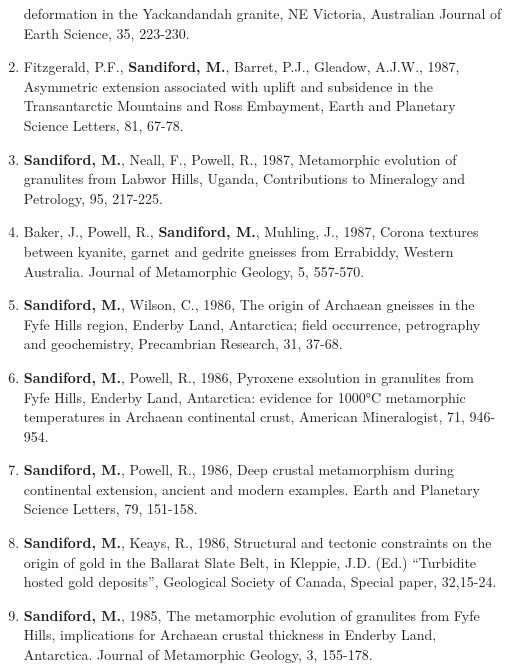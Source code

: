 \documentclass[
]{article}
\begin{document}
\begin{enumerate}
  deformation in the Yackandandah granite, NE Victoria, Australian
  Journal of Earth Science, 35, 223-230. 
\item
  Fitzgerald, P.F., \textbf{Sandiford, M.}, Barret, P.J., Gleadow,
  A.J.W., 1987, Asymmetric extension associated with uplift and
  subsidence in the Transantarctic Mountains and Ross Embayment, Earth
  and Planetary Science Letters, 81, 67-78. 
\item
  \textbf{Sandiford, M.}, Neall, F., Powell, R., 1987, Metamorphic
  evolution of granulites from Labwor Hills, Uganda, Contributions to
  Mineralogy and Petrology, 95, 217-225. 
\item
  Baker, J., Powell, R., \textbf{Sandiford, M.}, Muhling, J., 1987,
  Corona textures between kyanite, garnet and gedrite gneisses from
  Errabiddy, Western Australia. Journal of Metamorphic Geology, 5,
  557-570. 
\item
  \textbf{Sandiford, M.}, Wilson, C., 1986, The origin of Archaean
  gneisses in the Fyfe Hills region, Enderby Land, Antarctica; field
  occurrence, petrography and geochemistry, Precambrian Research, 31,
  37-68. \\
\item
  \textbf{Sandiford, M.}, Powell, R., 1986, Pyroxene exsolution in
  granulites from Fyfe Hills, Enderby Land, Antarctica: evidence for
  1000°C metamorphic temperatures in Archaean continental crust,
  American Mineralogist, 71, 946-954. \\
\item
  \textbf{Sandiford, M.}, Powell, R., 1986, Deep crustal metamorphism
  during continental extension, ancient and modern examples. Earth and
  Planetary Science Letters, 79, 151-158. \\
\item
  \textbf{Sandiford, M.}, Keays, R., 1986, Structural and tectonic
  constraints on the origin of gold in the Ballarat Slate Belt, in
  Kleppie, J.D. (Ed.) ``Turbidite hosted gold deposits'', Geological
  Society of Canada, Special paper, 32,15-24.
  \\
\item
  \textbf{Sandiford, M.}, 1985, The metamorphic evolution of granulites
  from Fyfe Hills, implications for Archaean crustal thickness in
  Enderby Land, Antarctica. Journal of Metamorphic Geology, 3, 155-178.

\end{enumerate}
\end{document}
